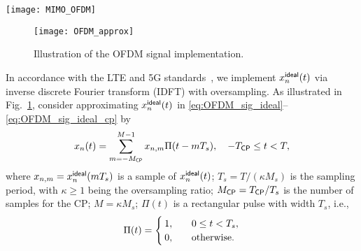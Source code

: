 \documentclass[10pt,twocolumn,twoside]{IEEEtran}
\begin{document}
\begin{figure*}[t]
	\centering
	\texttt{[image: MIMO\_OFDM]}
	\caption{Multi-user MIMO-OFDM system model with the first-order ${\Sigma \Delta}$ modulator.}
	\label{fig:sys_mod}
\end{figure*}

\begin{figure}[t]
	\centering
	\texttt{[image: OFDM\_approx]}
	\caption{Illustration of the OFDM signal implementation.}
	\label{fig:OFDM_approx}
\end{figure}

In accordance with the LTE and 5G standards~\cite{dahlman20134g,5G_ofdm}, we implement $x^{\sf ideal}_n(t)$ via inverse discrete Fourier transform (IDFT) with oversampling.
As illustrated in Fig.~\ref{fig:OFDM_approx}, consider approximating $x^{\sf ideal}_n(t)$ in \eqref{eq:OFDM_sig_ideal}--\eqref{eq:OFDM_sig_ideal_cp} by
\begin{equation}\label{eq:OFDM_sig}
	x_n(t) =  \sum_{m=-M_{\sf CP}}^{M-1}  x_{n,m} \Pi(t-mT_s), \quad -T_{\sf CP} \le t < T,
\end{equation}
where
$x_{n,m} = x_n^{\sf ideal}(mT_s)$ is a sample of $x_n^{\sf ideal}(t)$;
$T_s = T/(\kappa M_s)$ is the sampling period, with $\kappa \ge 1$ being the oversampling ratio;
$M_{\sf CP} = T_{\sf CP}/T_s$ is the number of samples for the CP;
$M = \kappa M_s$;
$\Pi(t)$ is a rectangular pulse with width $T_s$, i.e.,
\begin{equation*}
	\Pi(t) =
	\begin{cases}
		1, &\quad 0 \le t < T_s,\\
		0, &\quad {\rm otherwise}.
	\end{cases}
\end{equation*}
\end{document}
